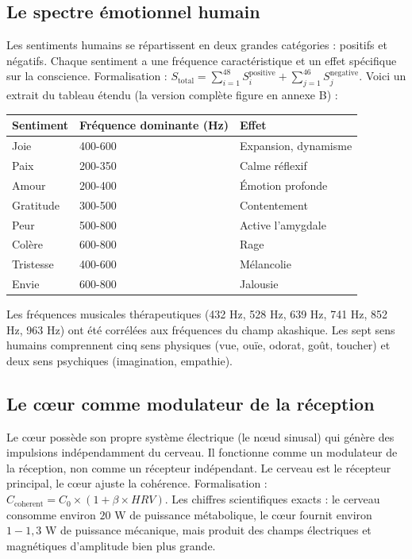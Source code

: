 \subsection{Le spectre émotionnel humain}
Les sentiments humains se répartissent en deux grandes catégories : positifs et négatifs. Chaque sentiment a une fréquence caractéristique et un effet spécifique sur la conscience. Formalisation : $S_{\text{total}} = \sum_{i=1}^{48} S_i^{\text{positive}} + \sum_{j=1}^{46} S_j^{\text{negative}}$. Voici un extrait du tableau étendu (la version complète figure en annexe B) :
\begin{table}[H]
\centering
\begin{tabular}{@{}lll@{}}
\toprule
\textbf{Sentiment} & \textbf{Fréquence dominante (Hz)} & \textbf{Effet} \\ \midrule
Joie & 400-600 & Expansion, dynamisme \\
Paix & 200-350 & Calme réflexif \\
Amour & 200-400 & Émotion profonde \\
Gratitude & 300-500 & Contentement \\
Peur & 500-800 & Active l'amygdale \\
Colère & 600-800 & Rage \\
Tristesse & 400-600 & Mélancolie \\
Envie & 600-800 & Jalousie \\ \bottomrule
\end{tabular}
\end{table}
Les fréquences musicales thérapeutiques (432 Hz, 528 Hz, 639 Hz, 741 Hz, 852 Hz, 963 Hz) ont été corrélées aux fréquences du champ akashique. Les sept sens humains comprennent cinq sens physiques (vue, ouïe, odorat, goût, toucher) et deux sens psychiques (imagination, empathie).

\subsection{Le cœur comme modulateur de la réception}
Le cœur possède son propre système électrique (le nœud sinusal) qui génère des impulsions indépendamment du cerveau. Il fonctionne comme un modulateur de la réception, non comme un récepteur indépendant. Le cerveau est le récepteur principal, le cœur ajuste la cohérence. Formalisation : $C_{\text{coherent}} = C_0 \times (1 + \beta \times HRV)$. Les chiffres scientifiques exacts : le cerveau consomme environ $20$ W de puissance métabolique, le cœur fournit environ $1-1,3$ W de puissance mécanique, mais produit des champs électriques et magnétiques d'amplitude bien plus grande.

